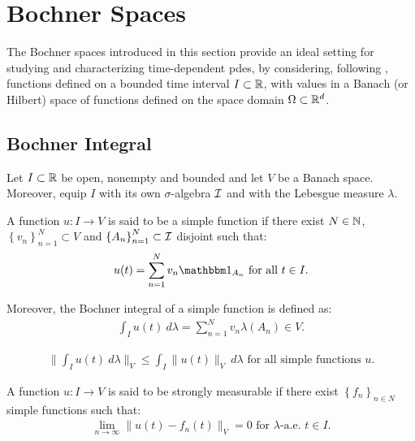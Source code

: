 \section{Bochner Spaces}

The Bochner spaces introduced in this section provide an ideal setting for studying and characterizing time-dependent \acrshort{pdes}, by considering, following \cite[p. 111]{Ern2021}, functions defined on a bounded time interval $I \subset \mathbb{R}$, with values in a Banach (or Hilbert) space of functions defined on the space domain $\Omega \subset \mathbb{R}^{d}$.

\subsection{Bochner Integral}

Let $I \subset \mathbb{R}$ be open, nonempty and bounded and let $V$ be a Banach space. Moreover, equip $I$ with its own $\sigma$-algebra $\mathcal{I}$ and with the Lebesgue measure $\lambda$.

\begin{definition}
    A function $u\colon I \rightarrow V$ is said to be a simple function if there exist $N \in \mathbb{N}$, $\left\{ v_n \right\}_{n = 1}^N \subset V$ and $\left\{ A_n \right\}_{n = 1}^N \subset \mathcal{I}$ disjoint such that:
    \begin{gather}
        u(t) = \sum_{n = 1}^N v_n \characteristic{A_n} \text{ for all } t \in I.
    \end{gather}

    Moreover, the Bochner integral of a simple function is defined as:
    \begin{gather}
        \int_I u(t) ~ d \lambda  = \sum_{n = 1}^N v_n \lambda(A_n) \in V.
    \end{gather}
\end{definition}

\begin{lemma}
    \begin{gather}
        \lVert \int_I u(t) ~ d \lambda \rVert_V \leq \int_I \lVert u(t) \rVert_V ~ d \lambda \text{ for all simple functions } u.
    \end{gather}
\end{lemma}

\begin{definition}
    A function $u\colon I \rightarrow V$ is said to be strongly measurable if there exist $\left\{ f_n \right\}_{n \in N}$ simple functions such that:
    \begin{gather}
        \lim_{n \rightarrow \infty} \lVert u(t) - f_n(t) \rVert_V = 0 \text{ for } \lambda \text{-a.e. } t \in I.
    \end{gather}
\end{definition}

